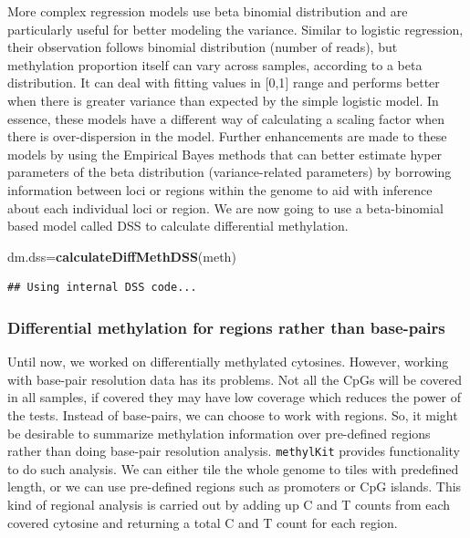 \documentclass[12pt,]{krantz}
\newenvironment{Shaded}{\begin{snugshade}}{\end{snugshade}}
\newcommand{\KeywordTok}[1]{\textcolor[rgb]{0.13,0.29,0.53}{\textbf{#1}}}
\newcommand{\NormalTok}[1]{#1}
\begin{document}
More complex regression models use beta binomial distribution and are particularly useful for better modeling the variance. Similar to logistic regression, their observation follows binomial distribution (number of reads), but methylation proportion itself can vary across samples, according to a beta distribution. It can deal with fitting values in {[}0,1{]} range and performs better when there is greater variance than expected by the simple logistic model. In essence, these models have a different way of calculating a scaling factor when there is over-dispersion in the model. Further enhancements are made to these models by using the Empirical Bayes methods that can better estimate hyper parameters of the beta distribution (variance-related parameters) by borrowing information between loci or regions within the genome to aid with inference about each individual loci or region. We are now going to use a beta-binomial based model called DSS\citep{Feng2014-pd} to calculate differential methylation.

\begin{Shaded}
\begin{Highlighting}[]
\NormalTok{dm.dss=}\KeywordTok{calculateDiffMethDSS}\NormalTok{(meth)}
\end{Highlighting}
\end{Shaded}

\begin{verbatim}
## Using internal DSS code...
\end{verbatim}

\hypertarget{differential-methylation-for-regions-rather-than-base-pairs}{%
\subsubsection{Differential methylation for regions rather than base-pairs}\label{differential-methylation-for-regions-rather-than-base-pairs}}

Until now, we worked on differentially methylated cytosines. However,
working with base-pair resolution data has its problems. Not all the CpGs will be covered in all samples, if covered they may have low coverage which reduces the power of the tests. Instead of base-pairs, we can choose to work with regions. So, it might be desirable to summarize methylation information over pre-defined regions rather than doing base-pair resolution analysis. \texttt{methylKit} provides functionality to do such analysis. We can either tile the whole genome to tiles with predefined length, or we can use pre-defined regions such as promoters or CpG islands. This kind of regional analysis is carried out by adding up C and T counts from each covered cytosine and returning a total C and T count for each region.
\end{document}
